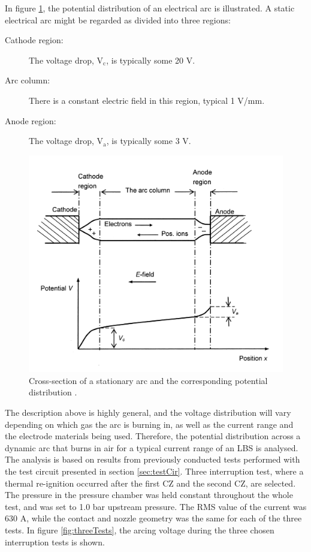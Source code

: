 \documentclass[10pt,b5paper,twoside]{article}
\begin{document}
In figure \ref{fig:potDisArc}, the potential distribution of an electrical arc is illustrated. A static electrical arc might be regarded as divided into three regions:

\begin{description}
\item[Cathode region:] The voltage drop, $\mathrm{V_c}$, is typically some 20 V.
\item[Arc column:]	There is a constant electric field in this region, typical 1 V/mm.
\item[Anode region:] The voltage drop, $\mathrm{V_a}$, is typically some 3 V.
\end{description}

\begin{figure}[H]
\centering
\includegraphics[scale=0.8]{Bilder/Theory/potentialDistArc.png}
\caption{Cross-section of a stationary arc and the corresponding potential distribution \cite{bib:HVEbreak}.} \label{fig:potDisArc}
\end{figure}

The description above is highly general, and the voltage distribution will vary depending on which gas the arc is burning in, as well as the current range and the electrode materials being used. Therefore, the potential distribution across a dynamic arc that burns in air for a typical current range of an LBS is analysed. The analysis is based on results from previously conducted tests performed with the test circuit presented in section \ref{sec:testCir}. Three interruption test, where a thermal re-ignition occurred after the first CZ and the second CZ, are selected. The pressure in the pressure chamber was held constant throughout the whole test, and was set to 1.0 bar upstream pressure. The RMS value of the current was 630 A, while the contact and nozzle geometry was the same for each of the three tests. In figure \ref{fig:threeTests}, the arcing voltage during the three chosen interruption tests is shown.
\end{document}

